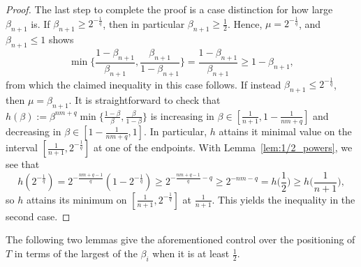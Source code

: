 \documentclass{amsart}
\begin{document}
\begin{proof}
The last step to complete the proof is a case distinction for how large $\beta_{n+1}$ is.
If $\beta_{n+1} \geq 2^{-\frac{1}{q}}$, then in particular $\beta_{n+1} \geq \frac{1}{2}$.
Hence, $\mu = 2^{-\frac{1}{q}}$, and $\beta_{n+1} \leq 1$ shows
\[
    \min \bigg\{ \frac{1-\beta_{n+1}}{\beta_{n+1}}, \frac{\beta_{n+1}}{1-\beta_{n+1}} \bigg\}
    = \frac{1-\beta_{n+1}}{\beta_{n+1}}
    \geq 1-\beta_{n+1},
\]
from which the claimed inequality in this case follows.
If instead $\beta_{n+1} \leq 2^{-\frac{1}{q}}$,
then $\mu = \beta_{n+1}$.
It is straightforward to check that $h(\beta) := \beta^{nm+q} \min \{ \frac{1-\beta}{\beta}, \frac{\beta}{1-\beta} \}$
is increasing in $\beta \in [\frac{1}{n+1},1-\frac{1}{nm+q}]$ and decreasing in $\beta \in [1-\frac{1}{nm+q},1]$.
In particular, $h$ attains it minimal value on the interval $[\frac{1}{n+1},2^{-\frac{1}{q}}]$ at one of the endpoints.
With Lemma~\ref{lem:1/2_powers}, we see that
\[
	h(2^{-\frac{1}{q}})
	= 2^{-\frac{nm+q-1}{q}} (1-2^{-\frac{1}{q}})
	\geq 2^{-\frac{nm+q-1}{q} - q}
	\geq 2^{-nm-q}
	= h \Big( \frac{1}{2} \Big)
	\geq h \Big( \frac{1}{n+1} \Big),
\]
so $h$ attains its minimum on $[\frac{1}{n+1},2^{-\frac{1}{q}}]$ at $\frac{1}{n+1}$.
This yields the inequality in the second case.
\end{proof}



The following two lemmas give the aforementioned control over the positioning of $T$ in terms of the largest of the $\beta_i$ when it is at least $\frac{1}{2}$.
\end{document}
